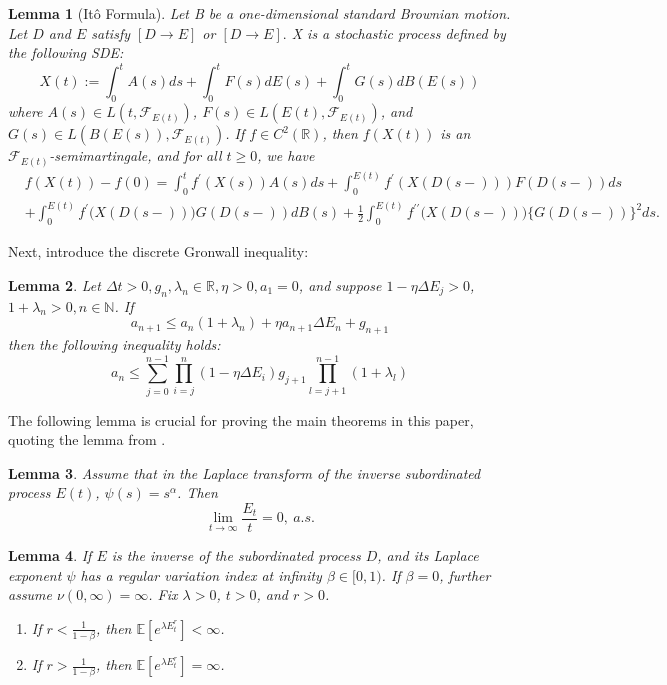 \documentclass[10pt,reqno,final]{amsart}
\theoremstyle{plain}
\newtheorem{lemma}{Lemma}[section]
\theoremstyle{definition}
\theoremstyle{remark}
\numberwithin{equation}{section}
\numberwithin{figure}{section}
\numberwithin{table}{section}
\begin{document}
\begin{lemma}[Itô Formula]\label{ito}
	Let B be a one-dimensional standard Brownian motion. Let $D$ and $E$ satisfy $[  D\longrightarrow E ]$ or $[  D\longrightarrow E ] .$ X is a stochastic process defined by the following SDE:
	$$X(t):=\int_0^tA(s)ds+\int_0^tF(s)dE(s)+\int_0^tG(s)dB(E(s))$$
	where $A(s)\in L( t, \mathcal{F} _{E(t)})$, $F(s)\in L( E(t), \mathcal{F} _{E(t)})$, and $G(s)\in L( B(E(s)), \mathcal{F} _{E(t)})$. If $f\in C^2( \mathbb{R} )$, then
	$f(X(t))$ is an $\mathcal{F}_{E(t)}$-semimartingale, and for all $t \ge 0$, we have
	$$\begin{aligned}
		&f(X(t))-f(0)=\int_{0}^{t}f^{\prime}(X(s))A(s)ds+\int_{0}^{E(t)}f^{\prime}\left(X(D(s-))\right)F(D(s-))ds\\
		&+\int_{0}^{E(t)}f^{\prime}\big(X(D(s-))\big)G(D(s-))dB(s)+\frac{1}{2}\int_{0}^{E(t)}f^{\prime\prime}\big(X(D(s-))\big)\big\{G(D(s-))\big\}^{2}ds.
	\end{aligned}$$
\end{lemma}

Next, introduce the discrete Gronwall inequality:
\begin{lemma}\label{gronwall}
	Let $\Delta t > 0,g_n,\lambda _n \in \mathbb{R},\eta > 0,a_1=0$, and suppose $1-\eta \Delta E_j > 0$, $1 + \lambda _n > 0,n \in \mathbb{N}$. If
	\begin{equation*}
		a_{n+1} \leq a_n(1+\lambda _n)+\eta a_{n+1}\Delta E_n +g_{n+1}
	\end{equation*}
	then the following inequality holds:
	\begin{equation}
		a_n \leq \sum\limits_{j=0}^{n-1}\prod_{i=j}^{n}(1-\eta\Delta E_i)g_{j+1}\prod\limits_{l=j+1}^{n-1}(1+\lambda _l)
	\end{equation}
\end{lemma}

The following lemma is crucial for proving the main theorems in this paper, quoting the lemma from \cite{nane2016stability}.

\begin{lemma}\label{slowerthant}
	Assume that in the Laplace transform of the inverse subordinated process $E(t)$, $\psi(s)=s^{\alpha}$. Then
	\begin{equation}
		\lim_{t\to\infty}\frac{E_t}{t}=0,\:a.s.
	\end{equation}
\end{lemma}


\begin{lemma}
	If $E$ is the inverse of the subordinated process $D$, and its Laplace exponent $\psi$ has a regular variation index at infinity $\beta \in [0, 1)$. If $\beta = 0$, further assume $\nu(0, \infty) = \infty$. Fix $\lambda > 0$, $t > 0$, and $r > 0$.
	\begin{enumerate}
		\item[(1)] If $r < \frac{1}{1 - \beta}$, then $\mathbb{E}\left[ e^{\lambda E_t^r} \right] < \infty$.
		\item[(2)] If $r > \frac{1}{1 - \beta}$, then $\mathbb{E}\left[ e^{\lambda E_t^r} \right] = \infty$.
	\end{enumerate}
	
\end{lemma}
\end{document}
